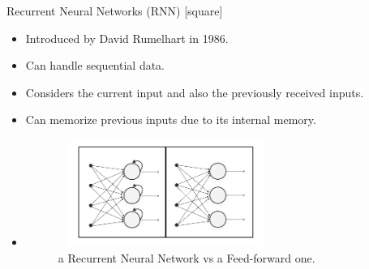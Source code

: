 \begin{frame}{Recurrent Neural Networks (RNN)}
    [square]
    \begin{itemize}
        \item{Introduced by David Rumelhart in 1986.}
        \vspace{0.2cm}
        \item{Can handle sequential data.}
        \vspace{0.2cm}
        \item{Considers the current input and also the previously received inputs.}
        \vspace{0.2cm}
        \item{Can memorize previous inputs due to its internal memory.}
        \vspace{0.2cm}
        \item[]{
        \begin{figure}[H]
            \centering
            \includegraphics[width=7cm,height=3.5cm]{images/rnn-vs-fnn.png}
            \caption{a Recurrent Neural Network vs a Feed-forward one.}
            \label{fig:rnn-vs-fnn}
        \end{figure}
        }
    \end{itemize}
\end{frame}

